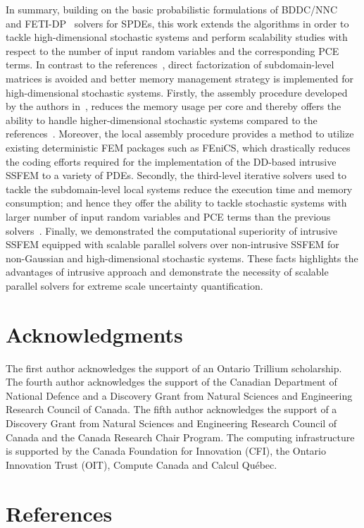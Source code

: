 \documentclass[letter,1p,11pt,oneside,onecolumn,sort&compress]{elsarticle}
\begin{document}
In summary, building on the basic probabilistic formulations of BDDC/NNC~\cite{subberJCP2014} and FETI-DP~\cite{subberCMAME2013} solvers for SPDEs, this work extends the algorithms in order to tackle high-dimensional stochastic systems and perform scalability studies with respect to the number of input random variables and the corresponding PCE terms. In contrast to the references~\cite{subberCMAME2013,subberJCP2014}, direct factorization of subdomain-level matrices is avoided and better memory management strategy is implemented for high-dimensional stochastic systems. Firstly, the assembly procedure developed by the authors in~\cite{desai2019scalable,desai2017scalable}, %
reduces the memory usage per core and thereby offers the ability to handle higher-dimensional stochastic systems compared to the references~\cite{subberCMAME2013,subberJCP2014}.
Moreover, the local assembly procedure provides a method to utilize existing deterministic FEM packages such as FEniCS, which drastically reduces the coding efforts required for the implementation of the DD-based intrusive SSFEM to a variety of PDEs.
Secondly, the third-level iterative solvers used to tackle the subdomain-level local systems reduce the execution time and memory consumption; and hence they offer the ability to tackle stochastic systems with larger number of input random variables and PCE terms than the previous solvers~\cite{subberCMAME2013,subberJCP2014}.
Finally, we demonstrated the computational superiority of intrusive SSFEM equipped with scalable parallel solvers over non-intrusive SSFEM for non-Gaussian and high-dimensional stochastic systems. These facts highlights the advantages of intrusive approach and demonstrate the necessity of scalable parallel solvers for extreme scale uncertainty quantification.

\section*{Acknowledgments}
The first author acknowledges  the support of  an Ontario Trillium scholarship.
The fourth author acknowledges  the support of the Canadian Department of National Defence and a Discovery Grant from Natural Sciences and Engineering Research Council of Canada.   The fifth author acknowledges the support of a  Discovery Grant from Natural Sciences and Engineering Research Council of Canada and the Canada Research Chair Program. The computing infrastructure is supported by the Canada Foundation for Innovation (CFI), the Ontario Innovation Trust (OIT),  Compute Canada and Calcul Qu\'ebec.



\clearpage

\section*{References}


\end{document}
